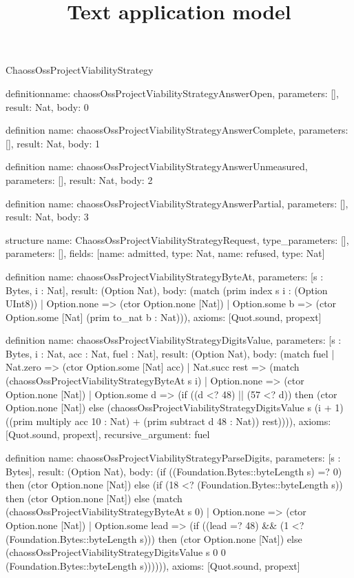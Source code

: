 \begin{lexlean}{ChaossOssProjectViabilityStrategy}
\title{Text application model}
\begin{semanticmodule}
definition{name: chaossOssProjectViabilityStrategyAnswerOpen, parameters: [], result: Nat, body: 0}

definition{
  name: chaossOssProjectViabilityStrategyAnswerComplete,
  parameters: [],
  result: Nat,
  body: 1
}

definition{
  name: chaossOssProjectViabilityStrategyAnswerUnmeasured,
  parameters: [],
  result: Nat,
  body: 2
}

definition{
  name: chaossOssProjectViabilityStrategyAnswerPartial,
  parameters: [],
  result: Nat,
  body: 3
}

structure{
  name: ChaossOssProjectViabilityStrategyRequest,
  type_parameters: [],
  parameters: [],
  fields: [{name: admitted, type: Nat}, {name: refused, type: Nat}]
}

definition{
  name: chaossOssProjectViabilityStrategyByteAt,
  parameters: [s : Bytes, i : Nat],
  result: (Option Nat),
  body: (match (prim index s i : (Option UInt8))
    | Option.none => (ctor Option.none [Nat])
    | Option.some b => (ctor Option.some [Nat] (prim to_nat b : Nat))),
  axioms: [Quot.sound, propext]
}

definition{
  name: chaossOssProjectViabilityStrategyDigitsValue,
  parameters: [s : Bytes, i : Nat, acc : Nat, fuel : Nat],
  result: (Option Nat),
  body: (match fuel
    | Nat.zero => (ctor Option.some [Nat] acc)
    | Nat.succ rest => (match (chaossOssProjectViabilityStrategyByteAt s i)
      | Option.none => (ctor Option.none [Nat])
      | Option.some d => (if ((d <? 48) || (57 <? d)) then (ctor Option.none [Nat]) else (chaossOssProjectViabilityStrategyDigitsValue s (i + 1) ((prim multiply acc 10 : Nat) + (prim subtract d 48 : Nat)) rest)))),
  axioms: [Quot.sound, propext],
  recursive_argument: fuel
}

definition{
  name: chaossOssProjectViabilityStrategyParseDigits,
  parameters: [s : Bytes],
  result: (Option Nat),
  body: (if ((Foundation.Bytes::byteLength s) =? 0) then (ctor Option.none [Nat]) else (if (18 <? (Foundation.Bytes::byteLength s)) then (ctor Option.none [Nat]) else (match (chaossOssProjectViabilityStrategyByteAt s 0)
    | Option.none => (ctor Option.none [Nat])
    | Option.some lead => (if ((lead =? 48) && (1 <? (Foundation.Bytes::byteLength s))) then (ctor Option.none [Nat]) else (chaossOssProjectViabilityStrategyDigitsValue s 0 0 (Foundation.Bytes::byteLength s)))))),
  axioms: [Quot.sound, propext]
}


\end{semanticmodule}
\end{lexlean}
